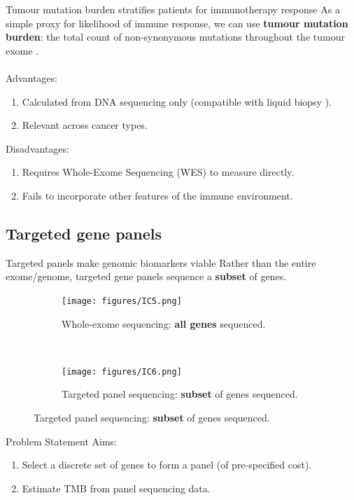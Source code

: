 \documentclass{beamer}
\begin{document}
\begin{frame}{Tumour mutation burden stratifies patients for immunotherapy response}
As a simple proxy for likelihood of immune response, we can use \textbf{tumour mutation burden}: the total count of non-synonymous mutations throughout the tumour exome \citep{zhu_association_2019, cao_high_2019}. \\
~\\
Advantages:
\begin{enumerate}[I]
    \item Calculated from DNA sequencing only (compatible with liquid biopsy \citep{gandara_blood-based_2018}).
    \item Relevant across cancer types.
\end{enumerate}
Disadvantages:
\begin{enumerate}[I]
    \item Requires Whole-Exome Sequencing (WES) to measure directly. 
    \item Fails to incorporate other features of the immune environment.
\end{enumerate}



\end{frame}

\subsection{Targeted gene panels}

\begin{frame}{Targeted panels make genomic biomarkers viable}
Rather than the entire exome/genome, targeted gene panels sequence a \textbf{subset} of genes.

\begin{figure}[t!]
    \centering
    \begin{subfigure}[t]{0.45\textwidth}
        \centering
        \texttt{[image: figures/IC5.png]}
        \caption{Whole-exome sequencing: \textbf{all genes} sequenced.}
    \end{subfigure}
    ~ 
    \begin{subfigure}[t]{0.45\textwidth}
        \centering
        \texttt{[image: figures/IC6.png]}
        \caption{Targeted panel sequencing: \textbf{subset} of genes sequenced.}
    \end{subfigure}
\end{figure}

\end{frame}
\begin{frame}{Problem Statement}
Aims: 

\begin{enumerate}[1]
\item Select a discrete set of genes to form a panel (of pre-specified cost). 
\item Estimate TMB from panel sequencing data.
\end{enumerate} 
~\\
\end{frame}
\end{document}

